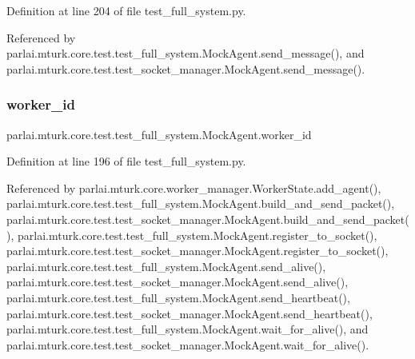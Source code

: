 Definition at line 204 of file test\+\_\+full\+\_\+system.\+py.



Referenced by parlai.\+mturk.\+core.\+test.\+test\+\_\+full\+\_\+system.\+Mock\+Agent.\+send\+\_\+message(), and parlai.\+mturk.\+core.\+test.\+test\+\_\+socket\+\_\+manager.\+Mock\+Agent.\+send\+\_\+message().

\mbox{\label{classparlai_1_1mturk_1_1core_1_1test_1_1test__full__system_1_1MockAgent_a13e0be9e86b661e6a03f80feb8025816}} 
\subsubsection{\texorpdfstring{worker\+\_\+id}{worker\_id}}
{\footnotesize\ttfamily parlai.\+mturk.\+core.\+test.\+test\+\_\+full\+\_\+system.\+Mock\+Agent.\+worker\+\_\+id}



Definition at line 196 of file test\+\_\+full\+\_\+system.\+py.



Referenced by parlai.\+mturk.\+core.\+worker\+\_\+manager.\+Worker\+State.\+add\+\_\+agent(), parlai.\+mturk.\+core.\+test.\+test\+\_\+full\+\_\+system.\+Mock\+Agent.\+build\+\_\+and\+\_\+send\+\_\+packet(), parlai.\+mturk.\+core.\+test.\+test\+\_\+socket\+\_\+manager.\+Mock\+Agent.\+build\+\_\+and\+\_\+send\+\_\+packet(), parlai.\+mturk.\+core.\+test.\+test\+\_\+full\+\_\+system.\+Mock\+Agent.\+register\+\_\+to\+\_\+socket(), parlai.\+mturk.\+core.\+test.\+test\+\_\+socket\+\_\+manager.\+Mock\+Agent.\+register\+\_\+to\+\_\+socket(), parlai.\+mturk.\+core.\+test.\+test\+\_\+full\+\_\+system.\+Mock\+Agent.\+send\+\_\+alive(), parlai.\+mturk.\+core.\+test.\+test\+\_\+socket\+\_\+manager.\+Mock\+Agent.\+send\+\_\+alive(), parlai.\+mturk.\+core.\+test.\+test\+\_\+full\+\_\+system.\+Mock\+Agent.\+send\+\_\+heartbeat(), parlai.\+mturk.\+core.\+test.\+test\+\_\+socket\+\_\+manager.\+Mock\+Agent.\+send\+\_\+heartbeat(), parlai.\+mturk.\+core.\+test.\+test\+\_\+full\+\_\+system.\+Mock\+Agent.\+wait\+\_\+for\+\_\+alive(), and parlai.\+mturk.\+core.\+test.\+test\+\_\+socket\+\_\+manager.\+Mock\+Agent.\+wait\+\_\+for\+\_\+alive().


